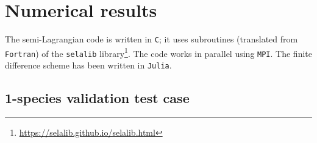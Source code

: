 \documentclass{article}
\numberwithin{equation}{section}
\newcommand{\todo}[1]{{\color{red}\textbf{#1}}}
\begin{document}
%
%

\section{Numerical results}\label{sec:numresults}

The semi-Lagrangian code is written in \texttt{C}; it uses subroutines (translated from \texttt{Fortran}) of the \texttt{selalib} library\footnote{\url{https://selalib.github.io/selalib.html}}. The code works in parallel using \texttt{MPI}.
The finite difference scheme has been written in \texttt{Julia}.

\subsection{1-species validation test case}
\end{document}
